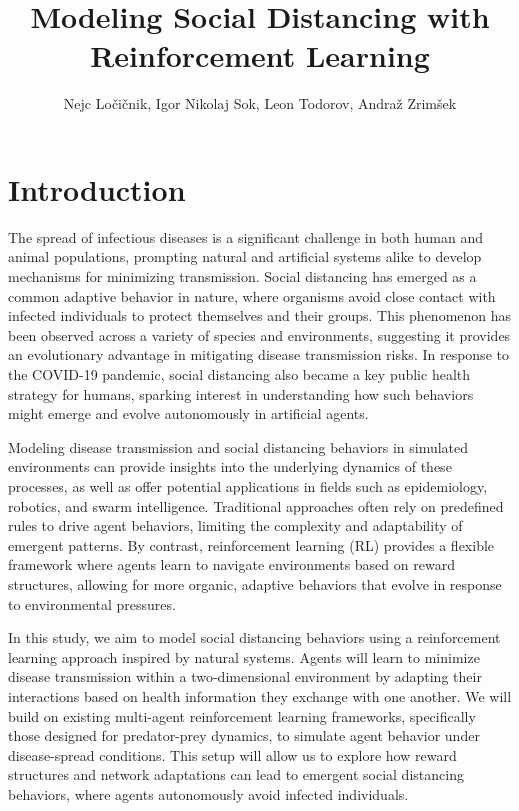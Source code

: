 \documentclass[9pt]{IEEEtran}
\title{\vspace{0ex}
Modeling Social Distancing with Reinforcement Learning}
\author{Nejc Ločičnik, Igor Nikolaj Sok, Leon Todorov, Andraž Zrimšek \vspace{-4.0ex}}
\begin{document}
\maketitle

\section{Introduction}

The spread of infectious diseases is a significant challenge in both human and animal populations, prompting natural and artificial systems alike to develop mechanisms for minimizing transmission. Social distancing has emerged as a common adaptive behavior in nature, where organisms avoid close contact with infected individuals to protect themselves and their groups. This phenomenon has been observed across a variety of species and environments, suggesting it provides an evolutionary advantage in mitigating disease transmission risks. In response to the COVID-19 pandemic, social distancing also became a key public health strategy for humans, sparking interest in understanding how such behaviors might emerge and evolve autonomously in artificial agents.

Modeling disease transmission and social distancing behaviors in simulated environments can provide insights into the underlying dynamics of these processes, as well as offer potential applications in fields such as epidemiology, robotics, and swarm intelligence. Traditional approaches often rely on predefined rules to drive agent behaviors, limiting the complexity and adaptability of emergent patterns. By contrast, reinforcement learning (RL) provides a flexible framework where agents learn to navigate environments based on reward structures, allowing for more organic, adaptive behaviors that evolve in response to environmental pressures.

In this study, we aim to model social distancing behaviors using a reinforcement learning approach inspired by natural systems. Agents will learn to minimize disease transmission within a two-dimensional environment by adapting their interactions based on health information they exchange with one another. We will build on existing multi-agent reinforcement learning frameworks, specifically those designed for predator-prey dynamics, to simulate agent behavior under disease-spread conditions. This setup will allow us to explore how reward structures and network adaptations can lead to emergent social distancing behaviors, where agents autonomously avoid infected individuals.
\end{document}
